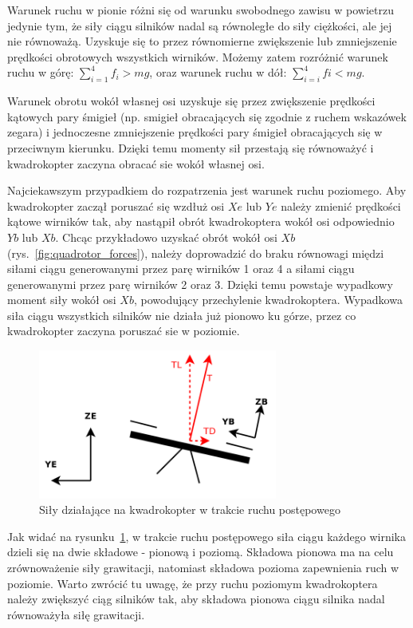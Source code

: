 Warunek ruchu w pionie różni się od warunku swobodnego zawisu w powietrzu jedynie tym, że siły ciągu silników nadal są równoległe do siły ciężkości, ale jej nie równoważą. Uzyskuje się to przez równomierne zwiększenie lub zmniejszenie prędkości obrotowych wszystkich wirników. Możemy zatem rozróżnić warunek ruchu w górę: $\sum_{i=1}^{4} f_i > mg$, oraz warunek ruchu w dół: $\sum_{i=i}^{4} fi < mg$.

Warunek obrotu wokół własnej osi uzyskuje się przez zwiększenie prędkości kątowych pary śmigieł (np. smigieł obracających się zgodnie z ruchem wskazówek zegara) i jednoczesne zmniejszenie prędkości pary śmigieł obracających się w przeciwnym kierunku. Dzięki temu momenty sił przestają się równoważyć i kwadrokopter zaczyna obracać sie wokół własnej osi.

Najciekawszym przypadkiem do rozpatrzenia jest warunek ruchu poziomego. Aby kwadrokopter zaczął poruszać się wzdłuż osi $Xe$ lub $Ye$ należy zmienić prędkości kątowe wirników tak, aby nastąpił obrót kwadrokoptera wokół osi odpowiednio $Yb$ lub $Xb$. Chcąc przykładowo uzyskać obrót wokół osi $Xb$ (rys.~\ref{fig:quadrotor_forces}), należy doprowadzić do braku równowagi międzi siłami ciągu generowanymi przez parę wirników 1 oraz 4 a siłami ciągu generowanymi przez parę wirników 2 oraz 3. Dzięki temu powstaje wypadkowy moment siły wokół osi $Xb$, powodujący przechylenie kwadrokoptera. Wypadkowa siła ciągu wszystkich silników nie działa już pionowo ku górze, przez co kwadrokopter zaczyna poruszać sie w poziomie. 

\begin{figure}[H]
	\centering
	\includegraphics[width=0.7\textwidth]{Pictures/quadrotor_drag_force.png}
	\caption[Dynamika ruchu postępowego]{Siły działające na kwadrokopter w trakcie ruchu postępowego}
	\label{fig:quadrotor_drag_force.png}
\end{figure}


Jak widać na rysunku~\ref{fig:quadrotor_drag_force.png}, w trakcie ruchu postępowego siła ciągu każdego wirnika dzieli się na dwie składowe - pionową i poziomą. Składowa pionowa ma na celu zrównoważenie siły grawitacji, natomiast składowa pozioma zapewnienia ruch w poziomie. Warto zwrócić tu uwagę, że przy ruchu poziomym kwadrokoptera należy zwiększyć ciąg silników tak, aby składowa pionowa ciągu silnika nadal równoważyła siłę grawitacji.


